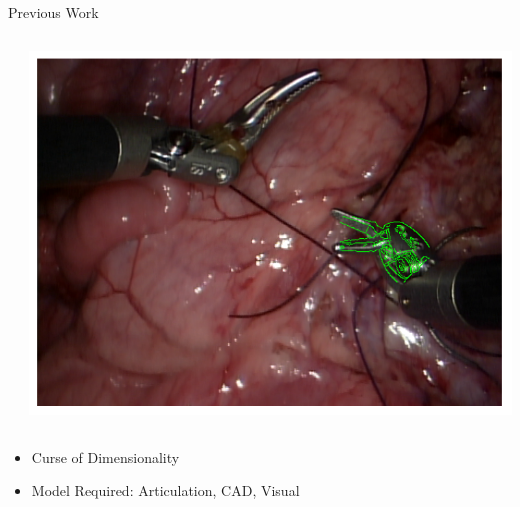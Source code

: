 \begin{frame}{Previous Work }
\begin{columns}
\begin{column}{0.5\textwidth}
\begin{columns}
\begin{column}{0.3\textwidth}
    \end{column}
    \begin{column}{0.7\textwidth}
      \centering
      \includegraphics[width = 1\textwidth]{figures/tool_image}
    \end{column}
  \end{columns}
\begin{itemize}
\item Curse of Dimensionality
\item Model Required: Articulation, CAD, Visual
\end{itemize}
\end{column}
  \end{columns}
\end{frame}

